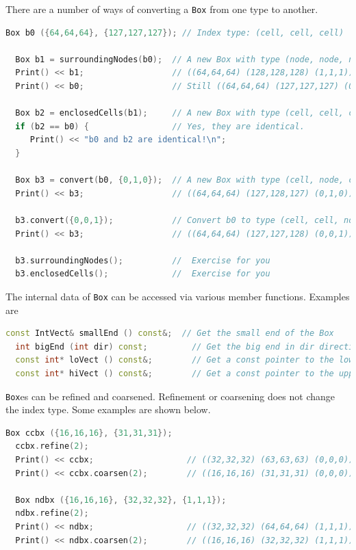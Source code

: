 {There are a number of ways of converting a {\tt Box} from one type to
another.
\begin{lstlisting}[language=cpp]
  Box b0 ({64,64,64}, {127,127,127}); // Index type: (cell, cell, cell)

  Box b1 = surroundingNodes(b0);  // A new Box with type (node, node, node)
  Print() << b1;                  // ((64,64,64) (128,128,128) (1,1,1))
  Print() << b0;                  // Still ((64,64,64) (127,127,127) (0,0,0))

  Box b2 = enclosedCells(b1);     // A new Box with type (cell, cell, cell)
  if (b2 == b0) {                 // Yes, they are identical.
     Print() << "b0 and b2 are identical!\n";
  }

  Box b3 = convert(b0, {0,1,0});  // A new Box with type (cell, node, cell)
  Print() << b3;                  // ((64,64,64) (127,128,127) (0,1,0))

  b3.convert({0,0,1});            // Convert b0 to type (cell, cell, node)
  Print() << b3;                  // ((64,64,64) (127,127,128) (0,0,1))

  b3.surroundingNodes();          //  Exercise for you
  b3.enclosedCells();             //  Exercise for you
\end{lstlisting}

The internal data of {\tt Box} can be accessed via various member functions.
Examples are
\begin{lstlisting}[language=cpp]
  const IntVect& smallEnd () const&;  // Get the small end of the Box
  int bigEnd (int dir) const;         // Get the big end in dir direction
  const int* loVect () const&;        // Get a const pointer to the lower end
  const int* hiVect () const&;        // Get a const pointer to the upper end
\end{lstlisting}

{\tt Box}es can be refined and coarsened.  Refinement or coarsening
does not change the index type.  Some examples are shown below.
\begin{lstlisting}[language=cpp]
  Box ccbx ({16,16,16}, {31,31,31});
  ccbx.refine(2);
  Print() << ccbx;                   // ((32,32,32) (63,63,63) (0,0,0))
  Print() << ccbx.coarsen(2);        // ((16,16,16) (31,31,31) (0,0,0))

  Box ndbx ({16,16,16}, {32,32,32}, {1,1,1});
  ndbx.refine(2);
  Print() << ndbx;                   // ((32,32,32) (64,64,64) (1,1,1))
  Print() << ndbx.coarsen(2);        // ((16,16,16) (32,32,32) (1,1,1))


\end{lstlisting}}
